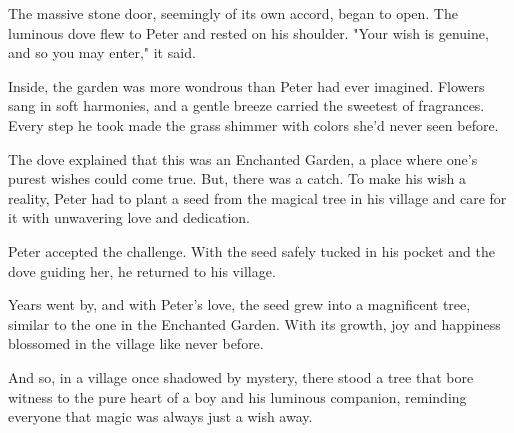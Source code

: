 \documentclass[10pt, a4paper, titlepage]{article}
\begin{document}
The massive stone door, seemingly of its own accord, began to open. The luminous dove flew to Peter and rested on his shoulder. "Your wish is genuine, and so you may enter," it said.

Inside, the garden was more wondrous than Peter had ever imagined. Flowers sang in soft harmonies, and a gentle breeze carried the sweetest of fragrances. Every step he took made the grass shimmer with colors she'd never seen before.

The dove explained that this was an Enchanted Garden, a place where one’s purest wishes could come true. But, there was a catch. To make his wish a reality, Peter had to plant a seed from the magical tree in his village and care for it with unwavering love and dedication.

Peter accepted the challenge. With the seed safely tucked in his pocket and the dove guiding her, he returned to his village.

Years went by, and with Peter's love, the seed grew into a magnificent tree, similar to the one in the Enchanted Garden. With its growth, joy and happiness blossomed in the village like never before.

And so, in a village once shadowed by mystery, there stood a tree that bore witness to the pure heart of a boy and his luminous companion, reminding everyone that magic was always just a wish away.
\end{document}
